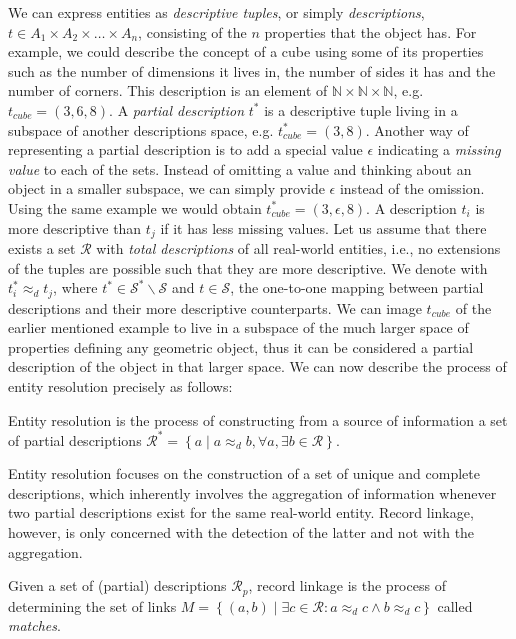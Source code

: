 We can express entities as \emph{descriptive tuples}, or simply \emph{descriptions}, $t \in A_{1} \times A_{2} \times \dots \times A_{n}$, consisting of the $n$ properties that the object has.
For example, we could describe the concept of a cube using some of its properties such as the number of dimensions it lives in, the number of sides it has and the number of corners.
This description is an element of $\mathbb{N} \times \mathbb{N} \times \mathbb{N}$, e.g. $t_{cube}=(3, 6, 8)$.
A \emph{partial description} $t^{*}$ is a descriptive tuple living in a subspace of another descriptions space, e.g. $t_{cube}^{*}=(3, 8)$.
Another way of representing a partial description is to add a special value $\epsilon$ indicating a \emph{missing value} to each of the sets.
Instead of omitting a value and thinking about an object in a smaller subspace, we can simply provide $\epsilon$ instead of the omission.
Using the same example we would obtain $t_{cube}^{*}=(3, \epsilon, 8)$.
A description $t_i$ is more descriptive than $t_j$ if it has less missing values.
Let us assume that there exists a set $\mathcal{R}$ with \emph{total descriptions} of all real-world entities, i.e., no extensions of the tuples are possible such that they are more descriptive.
We denote with $t_{i}^{*} \approx_{d} t_{j}$, where $t^{*} \in \mathcal{S}^{*} \backslash \mathcal{S}$ and $t \in \mathcal{S}$, the one-to-one mapping between partial descriptions and their more descriptive counterparts.
We can image $t_{cube}$ of the earlier mentioned example to live in a subspace of the much larger space of properties defining any geometric object, thus it can be considered a partial description of the object in that larger space.
We can now describe the process of entity resolution precisely as follows:

\begin{definition}
    Entity resolution is the process of constructing from a source of information a set of partial descriptions $\mathcal{R}^{*} = \left\{ a \mid a \approx_{d} b, \forall{a}, \exists{b} \in \mathcal{R} \right\}$.
\end{definition}

\noindent Entity resolution focuses on the construction of a set of unique and complete descriptions, which inherently involves the aggregation of information whenever two partial descriptions exist for the same real-world entity.
Record linkage, however, is only concerned with the detection of the latter and not with the aggregation.

\begin{definition}
    Given a set of (partial) descriptions $\mathcal{R}_{p}$, record linkage is the process of determining the set of links $M = \left\{ (a, b) \mid \exists{c} \in \mathcal{R}: a \approx_{d} c \wedge b \approx_{d} c \right\}$ called \emph{matches}.
\end{definition}

